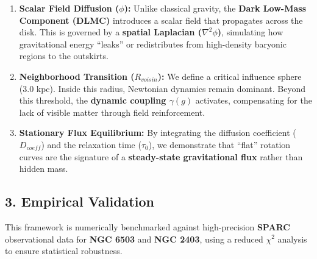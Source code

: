 \documentclass[
]{article}
\providecommand{\tightlist}{%
  \setlength{\itemsep}{0pt}\setlength{\parskip}{0pt}}
\begin{document}
\begin{enumerate}
\def\labelenumi{\arabic{enumi}.}
\tightlist
\item
  \textbf{Scalar Field Diffusion (\(\phi\)):} Unlike classical gravity,
  the \textbf{Dark Low-Mass Component (DLMC)} introduces a scalar field
  that propagates across the disk. This is governed by a \textbf{spatial
  Laplacian (\(\nabla^2 \phi\))}, simulating how gravitational energy
  ``leaks'' or redistributes from high-density baryonic regions to the
  outskirts.
\item
  \textbf{Neighborhood Transition (\(R_{voisin}\)):} We define a
  critical influence sphere (3.0 kpc). Inside this radius, Newtonian
  dynamics remain dominant. Beyond this threshold, the \textbf{dynamic
  coupling \(\gamma(g)\)} activates, compensating for the lack of
  visible matter through field reinforcement.
\item
  \textbf{Stationary Flux Equilibrium:} By integrating the diffusion
  coefficient (\(D_{coeff}\)) and the relaxation time (\(\tau_0\)), we
  demonstrate that ``flat'' rotation curves are the signature of a
  \textbf{steady-state gravitational flux} rather than hidden mass.
\end{enumerate}

\subsection{3. Empirical Validation}\label{empirical-validation}

This framework is numerically benchmarked against high-precision
\textbf{SPARC} observational data for \textbf{NGC 6503} and \textbf{NGC
2403}, using a reduced \(\chi^2\) analysis to ensure statistical
robustness.
\end{document}
